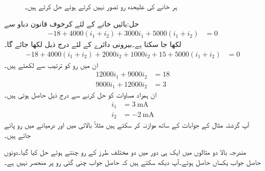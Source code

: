 \begin{figure}
\centering
{}%
\caption{ہر خانے کی علیحدہ رو تصور نہیں کرتے ہوئے حل کرتے ہیں۔}
\label{شکل_جوڑ_رو_دوسری_کو_لپیٹتی_ہے}
\end{figure}%
حل:بائیں خانے کے لئے کرخوف قانون دباو سے
\begin{align*}
-18+4000(i_1+i_2)+3000 i_1+5000(i_1+i_2)&=0
\end{align*}
لکھا جا سکتا ہے۔بیرونی دائرے کے لئے درج ذیل لکھا جائے گا۔
\begin{align*}
-18+4000(i_1+i_2)+2000i_2 +1000i_2 +15+5000(i_1+i_2)&=0
\end{align*}
ان میں رو کو ترتیب سے لکھتے ہیں۔
\begin{align*}
12000 i_1+9000 i_2&=18\\
9000i_1+12000i_2&=3
\end{align*}
ان ہمزاد مساوات کو حل کرنے سے درج ذیل حاصل ہوتی ہیں۔
\begin{align*}
i_1&=\SI{3}{\milli\ampere}\\
i_2&=\SI{-2}{\milli\ampere}
\end{align*}
آپ گزشتہ مثال کے جوابات کے ساتھ موازنہ کر سکتے ہیں مثلاً بالائی  میں  اور درمیانے  میں  رو پائے جاتے ہیں۔

مندرجہ بالا دو مثالوں میں ایک ہی دور میں دو مختلف طرز کے رو چنتے ہوئے حل کیا گیا۔دونوں حاصل جواب یکساں حاصل ہوئے۔آپ دیکھ سکتے ہیں کہ حاصل جواب چنی گئی رو پر منحصر نہیں ہے۔


